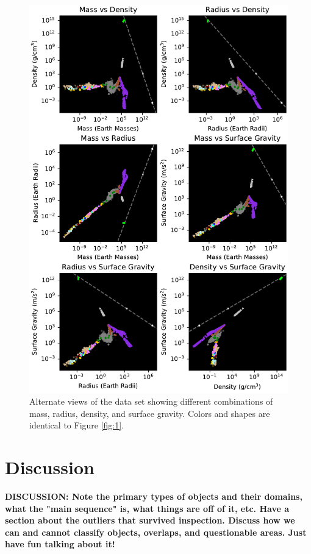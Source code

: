 \documentclass[twocolumn,linenumbers]{aastex631}
\begin{document}
\begin{figure}[htbp]
\centering
\includegraphics[scale = 1]{AltVariableViews.pdf}
\centering
\caption{Alternate views of the data set showing different combinations of mass, radius, density, and surface gravity. Colors and shapes are identical to  Figure \ref{fig:1}.}
\label{fig:3}
\end{figure}

\section{Discussion} \label{sec:intro}

\textbf{\color{blue}DISCUSSION: Note the primary types of objects and their domains, what the "main sequence" is, what things are off of it, etc. Have a section about the outliers that survived inspection. Discuss how we can and cannot classify objects, overlaps, and questionable areas. Just have fun talking about it!\color{black}}
\end{document}
